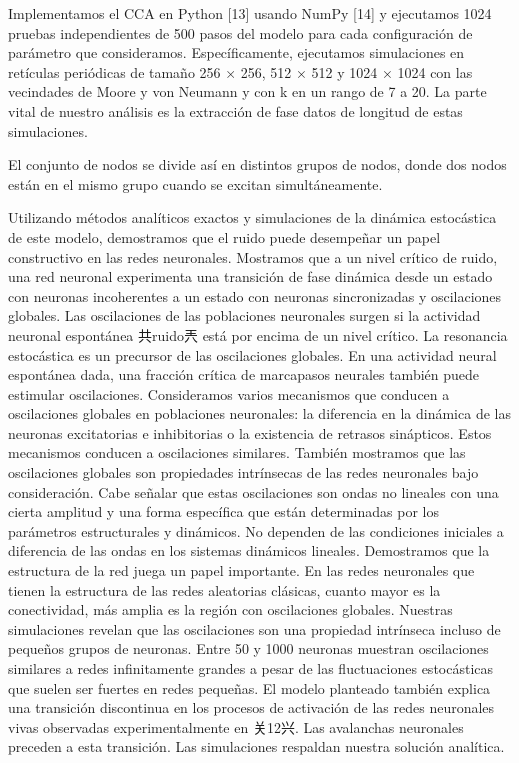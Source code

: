 Implementamos el CCA en Python [13] usando NumPy [14] y ejecutamos 1024 pruebas independientes de 500 pasos del modelo para cada configuración de parámetro que consideramos. Específicamente, ejecutamos simulaciones en retículas periódicas de tamaño 256 × 256, 512 × 512 y 1024 × 1024 con las vecindades de Moore y von Neumann y con k en un rango de 7 a 20. La parte vital de nuestro análisis es la extracción de fase datos de longitud de estas simulaciones.

El conjunto de nodos se divide así en distintos grupos de nodos, donde dos nodos están en el mismo grupo cuando se excitan simultáneamente.



Utilizando métodos analíticos exactos y simulaciones de la dinámica estocástica de este modelo, demostramos que el ruido puede desempeñar un papel constructivo en las redes neuronales. Mostramos que a un nivel crítico de ruido, una red neuronal experimenta una transición de fase dinámica desde un estado con neuronas incoherentes a un estado con neuronas sincronizadas y oscilaciones globales. Las oscilaciones de las poblaciones neuronales surgen si la actividad neuronal espontánea 共ruido兲 está por encima de un nivel crítico.
La resonancia estocástica es un precursor de las oscilaciones globales. En una actividad neural espontánea dada, una fracción crítica de marcapasos neurales también puede estimular oscilaciones. Consideramos varios mecanismos que conducen a oscilaciones globales en poblaciones neuronales: la diferencia en la dinámica de las neuronas excitatorias e inhibitorias o la existencia de retrasos sinápticos. Estos mecanismos conducen a oscilaciones similares. También mostramos que las oscilaciones globales son propiedades intrínsecas de las redes neuronales bajo consideración. Cabe señalar que estas oscilaciones son ondas no lineales con una cierta amplitud y una forma específica que están determinadas por los parámetros estructurales y dinámicos. No dependen de las condiciones iniciales a diferencia de las ondas en los sistemas dinámicos lineales. Demostramos que la estructura de la red juega un papel importante. En las redes neuronales que tienen la estructura de las redes aleatorias clásicas, cuanto mayor es la conectividad, más amplia es la región con oscilaciones globales. Nuestras simulaciones revelan que las oscilaciones son una propiedad intrínseca incluso de pequeños grupos de neuronas. Entre 50 y 1000 neuronas muestran oscilaciones similares a redes infinitamente grandes a pesar de las fluctuaciones estocásticas que suelen ser fuertes en redes pequeñas. El modelo planteado también explica una transición discontinua en los procesos de activación de las redes neuronales vivas observadas experimentalmente en 关12兴. Las avalanchas neuronales preceden a esta transición. Las simulaciones respaldan nuestra solución analítica.


